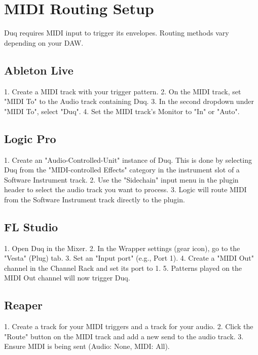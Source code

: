 \chapter{MIDI Routing Setup}
\label{ch:midi_routing}

Duq requires MIDI input to trigger its envelopes. Routing methods vary depending on your DAW.

\section{Ableton Live}
1. Create a MIDI track with your trigger pattern.
2. On the MIDI track, set "MIDI To" to the Audio track containing Duq.
3. In the second dropdown under "MIDI To", select "Duq".
4. Set the MIDI track's Monitor to "In" or "Auto".

\section{Logic Pro}
1. Create an "Audio-Controlled-Unit" instance of Duq. This is done by selecting Duq from the "MIDI-controlled Effects" category in the instrument slot of a Software Instrument track.
2. Use the "Sidechain" input menu in the plugin header to select the audio track you want to process.
3. Logic will route MIDI from the Software Instrument track directly to the plugin.

\section{FL Studio}
1. Open Duq in the Mixer.
2. In the Wrapper settings (gear icon), go to the "Vesta" (Plug) tab.
3. Set an "Input port" (e.g., Port 1).
4. Create a "MIDI Out" channel in the Channel Rack and set its port to 1.
5. Patterns played on the MIDI Out channel will now trigger Duq.

\section{Reaper}
1. Create a track for your MIDI triggers and a track for your audio.
2. Click the "Route" button on the MIDI track and add a new send to the audio track.
3. Ensure MIDI is being sent (Audio: None, MIDI: All).
